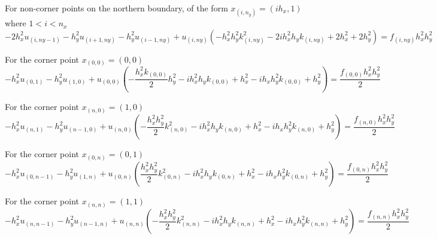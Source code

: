 \documentclass[a4paper, landscape, 11pt]{article}
\begin{document}
For non-corner points on the northern boundary, of the form
\(x_{(i,n_y)}=(ih_x,1)\) where \(1<i<n_x\)
\[- 2 h_{x}^{2} u_{{(i,ny-1)}} - h_{y}^{2} u_{{(i+1,n y)}} - h_{y}^{2} u_{{(i-1,ny)}} + u_{{(i,n y)}} \left(- h_{x}^{2} h_{y}^{2} k_{{(i,n y)}}^{2} - 2 i h_{x}^{2} h_{y} k_{{(i,n y)}} + 2 h_{x}^{2} + 2 h_{y}^{2}\right)= f_{{(i,n y)}} h_{x}^{2} h_{y}^{2} \]

For the corner point \(x_{(0,0)}=(0,0)\)
\[- h_{x}^{2} u_{{(0,1)}} - h_{y}^{2} u_{{(1,0)}} + u_{{(0,0)}} \left(- \frac{h_{x}^{2} k_{{(0,0)}}}{2} h_{y}^{2} - i h_{x}^{2} h_{y} k_{{(0,0)}} + h_{x}^{2} - i h_{x} h_{y}^{2} k_{{(0,0)}} + h_{y}^{2}\right)=\frac{f_{(0,0)}h_x^2h_y^2}{2}\]

For the corner point \(x_{(n,0)}=(1,0)\)
\[- h_{x}^{2} u_{{(n,1)}} - h_{y}^{2} u_{{(n-1,0)}} + u_{{(n,0)}} \left(- \frac{h_{x}^{2} h_{y}^{2}}{2} k_{{(n,0)}}^{2} - i h_{x}^{2} h_{y} k_{{(n,0)}} + h_{x}^{2} - i h_{x} h_{y}^{2} k_{{(n,0)}} + h_{y}^{2}\right)= \frac{f_{{(n,0)}} h_{x}^{2}h_{y}^2}{2}\]

For the corner point \(x_{(0,n)}=(0,1)\)
\[- h_{x}^{2} u_{{(0,n-1)}} - h_{y}^{2} u_{{(1,n)}} + u_{{(0,n)}} \left(\frac{h_{x}^{2} h_{y}^{2}}{2} k_{{(0,n)}}^{2} - i h_{x}^{2} h_{y} k_{{(0,n)}} + h_{x}^{2} - i h_{x} h_{y}^{2} k_{{(0,n)}} + h_{y}^{2}\right)=  \frac{f_{{(0,n)}} h_{x}^{2}h_y^2}{2}\]

For the corner point \(x_{(n,n)}=(1,1)\)
\[-h_{x}^{2} u_{{(n,n-1)}} - h_{y}^{2} u_{{(n-1,n)}} + u_{{(n,n)}} \left(- \frac{h_{x}^{2} h_{y}^{2}}{2} k_{{(n,n)}}^{2} - i h_{x}^{2} h_{y} k_{{(n,n)}} + h_{x}^{2} - i h_{x} h_{y}^{2} k_{{(n,n)}} + h_{y}^{2}\right)= \frac{f_{{(n,n)}} h_{x}^{2} h_{y}^{2}}{2} \]


    
    
    
    
\end{document}
